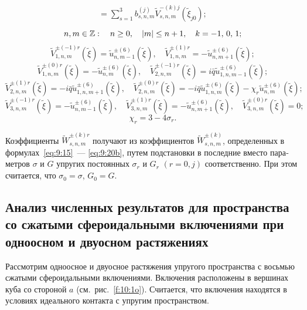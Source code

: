 \begin{russian}
\begin{multline}
= \sum\limits_{s = 1}^3 {b_{s,n,m}^{(j)}} \tilde V_{s,n,m}^{ - (k)j}({\tilde \xi _{j0}});
\end{multline}
$$
n,m \in\mathbb{Z}:\quad n \ge 0,\quad |m| \le n + 1,\quad k =  - 1,{\mkern 1mu} {\kern 1pt} 0,{\mkern 1mu} {\kern 1pt} 1;
$$
$$
\tilde V_{1,n,m}^{ \pm ( - 1)r}(\tilde \xi ) = \tilde u_{n,m - 1}^{ \pm (6)}(\tilde \xi ),\quad \tilde V_{1,n,m}^{ \pm (1)r} =  - \tilde u_{n,m + 1}^{ \pm (6)}(\tilde \xi );
$$
$$
\tilde V_{1,n,m}^{ \pm (0)r}(\tilde \xi ) =  - \tilde u_{n,m}^{ \pm (6)}(\tilde \xi ),\quad \tilde V_{2,n,m}^{ \pm ( - 1)r}(\tilde \xi ) = i\bar q\tilde u_{1,n,m - 1}^{ \pm (6)}(\tilde \xi );
$$
$$
\tilde V_{2,n,m}^{ \pm (1)r}(\tilde \xi ) =  - i\bar q\tilde u_{1,n,m + 1}^{ \pm (6)}(\tilde \xi ),\quad \tilde V_{2,n,m}^{ \pm (0)r}(\tilde \xi ) =  - i\bar q\tilde u_{1,n,m}^{ \pm (6)}(\tilde \xi ) - {\chi _r}\tilde u_{n,m}^{ \pm (6)}(\tilde \xi );
$$
$$
\tilde V_{3,n,m}^{ \pm ( - 1)r}(\tilde \xi ) =  - \tilde u_{n,m - 1}^{ \pm (6)}(\tilde \xi ),\quad \tilde V_{3,n,m}^{ \pm (1)r}(\tilde \xi ) =  - \tilde u_{n,m + 1}^{ \pm (6)}(\tilde \xi ),\quad \tilde V_{3,n,m}^{ \pm (0)r}(\tilde \xi ) = 0;
$$
$$
{\chi _r} = 3 - 4{\sigma _r}.
$$

Коэффициенты $\tilde W_{s,n,m}^{ \pm (k)r}$ получают из коэффициентов $\tilde W_{s,n,m}^{ \pm (k)}$, определенных в формулах~\eqref{eq:9:15}~--- \eqref{eq:9:20b}, путем подстановки в последние вместо параметров $\sigma$ и $G$ упругих постоянных $\sigma_r$ и $G_r$ $(r=0,j)$ соответственно. При этом считается, что $\sigma_0=\sigma$, $G_0=G$.

\subsection{Анализ численных результатов для пространства со сжатыми сфероидальными включениями при одноосном и двуосном растяжениях}

Рассмотрим одноосное и двуосное растяжения упругого пространства с восьмью сжатыми сфероидальными включениями. Включения расположены в вершинах куба со стороной $a$ (см.~рис.~\ref{f:10:1o}). Считается, что включения находятся в условиях идеального контакта с упругим пространством.


\end{russian}
